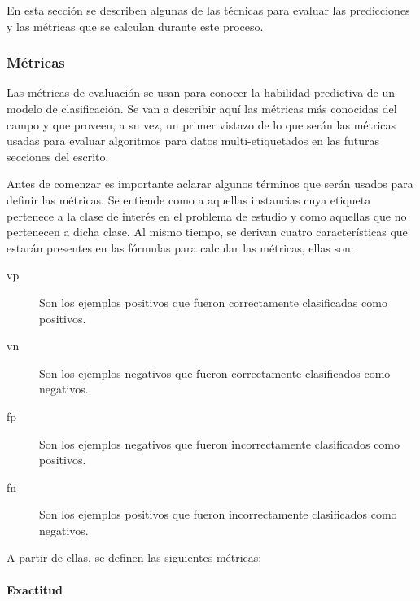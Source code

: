 En esta sección se describen algunas de las técnicas para evaluar las
predicciones y las métricas que se calculan durante este proceso.

\subsubsection{Métricas}
\label{evaluacion_metricas}

Las métricas de evaluación se usan para conocer la habilidad predictiva de un
modelo de clasificación. Se van a describir aquí las métricas más conocidas del
campo y que proveen, a su vez, un primer vistazo de lo que serán las métricas
usadas para evaluar algoritmos para datos multi-etiquetados en las futuras
secciones del escrito. 

Antes de comenzar es importante aclarar algunos términos que serán usados para
definir las métricas. Se entiende como  a aquellas
instancias cuya etiqueta pertenece a la clase de interés en el problema de
estudio y  como aquellas que no pertenecen a dicha
clase. Al mismo tiempo, se derivan cuatro características que estarán presentes
en las fórmulas para calcular las métricas, ellas son: 

\begin{description}

   \item[\acrfull{vp}] Son los ejemplos positivos que fueron correctamente
      clasificadas como positivos.

   \item[\acrfull{vn}] Son los ejemplos negativos que fueron correctamente
      clasificados como negativos.

   \item[\acrfull{fp}] Son los ejemplos negativos que fueron incorrectamente
      clasificados como positivos.

   \item[\acrfull{fn}] Son los ejemplos positivos que fueron incorrectamente
      clasificados como negativos.

\end{description}

A partir de ellas, se definen las siguientes métricas:

\paragraph{Exactitud}
\label{evaluacion_metricas_exactitud}

